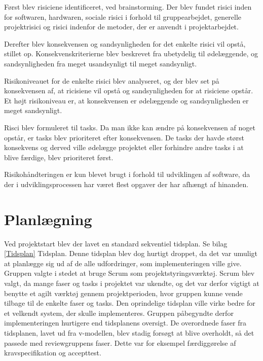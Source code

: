 Først blev risiciene identificeret, ved brainstorming. Der blev fundet risici inden for softwaren, hardwaren, sociale risici i forhold til gruppearbejdet, generelle projektrisici og risici indenfor de metoder, der er anvendt i projektarbejdet.

Derefter blev konsekvensen og sandsynligheden for det enkelte risici vil opstå, stillet op. Konsekvenskriterierne blev beskrevet fra ubetydelig til ødelæggende, og sandsynligheden fra meget usandsynligt til meget sandsynligt.

Risikoniveauet for de enkelte risici blev analyseret, og der blev set på konsekvensen af, at ricisiene vil opstå og sandsynligheden for at risiciene opstår. Et højt risikoniveau er, at konsekvensen er ødelæggende og sandsynligheden er meget sandsynligt. 

Risci blev formuleret til tasks. Da man ikke kan ændre på konsekvensen af noget opstår, er tasks blev prioriteret efter konsekvensen. De tasks der havde størst konsekvens og derved ville ødelægge projektet eller forhindre andre tasks i at blive færdige, blev prioriteret først. 

Risikohåndteringen er kun blevet brugt i forhold til udviklingen af software, da der i udviklingsprocessen har været flest opgaver der har afhængt af hinanden.

\section{Planlægning}
Ved projektstart blev der lavet en standard sekventiel tidsplan. Se bilag \ref{Tidsplan} Tidsplan. Denne tidsplan blev dog hurtigt droppet, da det var umuligt at planlægge sig ud af de alle udfordringer, som implementeringen ville give. Gruppen valgte i stedet at bruge Scrum som projektstyringsværktøj. Scrum blev valgt, da mange faser og tasks i projektet var ukendte, og det var derfor vigtigt at benytte et agilt værktøj gennem projektperioden, hvor gruppen kunne vende tilbage til de enkelte faser og tasks. Den oprindelige tidsplan ville virke bedre for et velkendt system, der skulle implementeres. Gruppen påbegyndte derfor implementeringen hurtigere end tidsplanens oversigt. De overordnede faser fra tidsplanen, lavet ud fra v-modellen, blev stadig forsøgt at blive overholdt, så det passede med reviewgruppens faser. Dette var for eksempel færdiggørelse af kravspecifikation og accepttest. 

